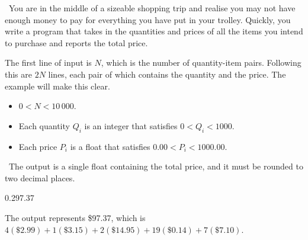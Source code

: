 
\Question\ You are in the middle of a sizeable shopping trip and realise you may not have
enough money to pay for everything you have put in your trolley. Quickly, you write a
program that takes in the quantities and prices of all the items you intend to purchase
and reports the total price.

\Input

The first line of input is $N$, which is the number of quantity-item pairs. Following this
are $2N$ lines, each pair of which contains the quantity and the price. The example will
make this clear.

\begin{itemize}
  \item $0 < N < 10\,000$.
  \item Each quantity $Q_i$ is an integer that satisfies $0 < Q_i < 1000$.
  \item Each price $P_i$ is a float that satisfies $0.00 < P_i < 1000.00$.
\end{itemize}

\Output\ The output is a single float containing the total price, and it must be rounded
to two decimal places.

\Sample

       {0.2}{97.37}

\Explanation The output represents \$97.37, which is $4(\$2.99) + 1(\$3.15) + 2(\$14.95)
+ 19(\$0.14) + 7(\$7.10)$.

